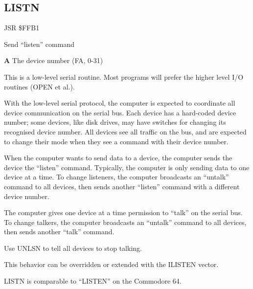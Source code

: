 \subsection{LISTN}
\label{KERNAL Jump Table!LISTN}
\begin{description}[leftmargin=2cm,style=nextline]
    \item [Address:] JSR \$FFB1
    \item [Description:] Send ``listen'' command
    \item [Inputs:]
        \textbf{A} The device number (FA, 0-31)
    \item [Remarks:]
        This is a low-level serial routine. Most programs will prefer the higher level I/O routines (OPEN et al.).

        With the low-level serial protocol, the computer is expected to coordinate all device communication on the serial bus. Each device has a hard-coded device number; some devices, like disk drives, may have switches for changing its recognised device number. All devices see all traffic on the bus, and are expected to change their mode when they see a command with their device number.

        When the computer wants to send data to a device, the computer sends the device the ``listen'' command. Typically, the computer is only sending data to one device at a time. To change listeners, the computer broadcasts an ``untalk'' command to all devices, then sends another ``listen'' command with a different device number.

        The computer gives one device at a time permission to ``talk'' on the serial bus. To change talkers, the computer broadcasts an ``untalk'' command to all devices, then sends another ``talk'' command.

        Use UNLSN to tell all devices to stop talking.

        This behavior can be overridden or extended with the ILISTEN vector.

        LISTN is comparable to ``LISTEN'' on the Commodore 64.

    \item [Example:]
\end{description}




